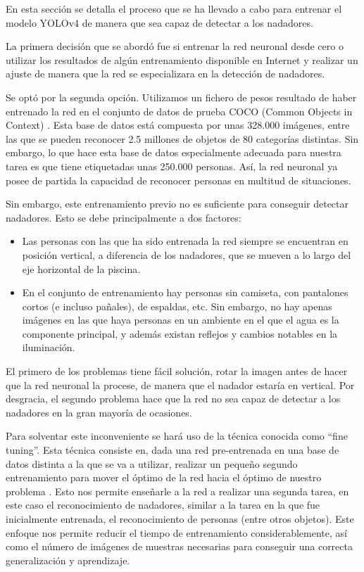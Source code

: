 En esta sección se detalla el proceso que se ha llevado a cabo para entrenar el modelo YOLOv4 de manera que sea capaz de detectar a los nadadores.

La primera decisión que se abordó fue si entrenar la red neuronal desde cero o utilizar los resultados de algún entrenamiento disponible en Internet y realizar un ajuste de manera que la red se especializara en la detección de nadadores.

Se optó por la segunda opción. Utilizamos un fichero de pesos resultado de haber entrenado la red en el conjunto de datos de prueba COCO (Common Objects in Context) \cite{cocodataset}. Esta base de datos está compuesta por unas 328.000 imágenes, entre las que se pueden reconocer 2.5 millones de objetos de 80 categorías distintas. Sin embargo, lo que hace esta base de datos especialmente adecuada para nuestra tarea es que tiene etiquetadas unas 250.000 personas. Así, la red neuronal ya posee de partida la capacidad de reconocer personas en multitud de situaciones. 

Sin embargo, este entrenamiento previo no es suficiente para conseguir detectar nadadores. Esto se debe principalmente a dos factores:
\begin{itemize}
    \item Las personas con las que ha sido entrenada la red siempre se encuentran en posición vertical, a diferencia de los nadadores, que se mueven a lo largo del eje horizontal de la piscina.
    \item En el conjunto de entrenamiento hay personas sin camiseta, con pantalones cortos (e incluso pañales), de espaldas, etc. Sin embargo, no hay apenas imágenes en las que haya personas en un ambiente en el que el agua es la componente principal, y además existan reflejos y cambios notables en la iluminación.
\end{itemize}
El primero de los problemas tiene fácil solución, rotar la imagen antes de hacer que la red neuronal la procese, de manera que el nadador estaría en vertical. Por desgracia, el segundo problema hace que la red no sea capaz de detectar a los nadadores en la gran mayoría de ocasiones.

Para solventar este inconveniente se hará uso de la técnica conocida como ``fine tuning''. Esta técnica consiste en, dada una red pre-entrenada en una base de datos distinta a la que se va a utilizar, realizar un pequeño segundo entrenamiento para mover el óptimo de la red hacia el óptimo de nuestro problema \cite{cnnindetail}. Esto nos permite enseñarle a la red a realizar una segunda tarea, en este caso el reconocimiento de nadadores, similar a la tarea en la que fue inicialmente entrenada, el reconocimiento de personas (entre otros objetos). Este enfoque nos permite reducir el tiempo de entrenamiento considerablemente, así como el número de imágenes de muestras necesarias para conseguir una correcta generalización y aprendizaje. 

